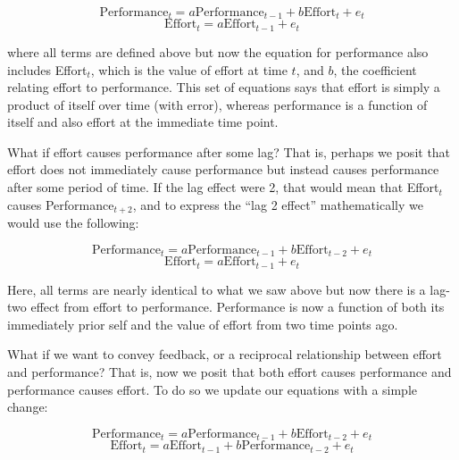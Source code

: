 \documentclass[english,,man]{apa6}
\theoremstyle{definition}
\theoremstyle{definition}
\theoremstyle{definition}
\theoremstyle{remark}
\begin{document}
\begin{equation}
\label{sysy2}
\textrm{Performance}_{t} = a \textrm{Performance}_{t - 1} + b \textrm{Effort}_{t} + e_{t}
\end{equation} \begin{equation}
\label{sysx2}
\textrm{Effort}_{t} = a \textrm{Effort}_{t - 1} + e_{t}
\end{equation}

\noindent where all terms are defined above but now the equation for
performance also includes Effort\(_t\), which is the value of effort at
time \(t\), and \(b\), the coefficient relating effort to performance.
This set of equations says that effort is simply a product of itself
over time (with error), whereas performance is a function of itself and
also effort at the immediate time point.

What if effort causes performance after some lag? That is, perhaps we
posit that effort does not immediately cause performance but instead
causes performance after some period of time. If the lag effect were 2,
that would mean that Effort\(_t\) causes Performance\(_{t+2}\), and to
express the \enquote{lag 2 effect} mathematically we would use the
following:

\begin{equation}
\label{sysy3}
\textrm{Performance}_{t} = a \textrm{Performance}_{t - 1} + b \textrm{Effort}_{t - 2} + e_{t}
\end{equation} \begin{equation}
\label{sysx3}
\textrm{Effort}_{t} = a \textrm{Effort}_{t - 1} + e_{t}
\end{equation}

\noindent Here, all terms are nearly identical to what we saw above but
now there is a lag-two effect from effort to performance. Performance is
now a function of both its immediately prior self and the value of
effort from two time points ago.

What if we want to convey feedback, or a reciprocal relationship between
effort and performance? That is, now we posit that both effort causes
performance and performance causes effort. To do so we update our
equations with a simple change:

\begin{equation}
\label{sysy3}
\textrm{Performance}_{t} = a \textrm{Performance}_{t - 1} + b \textrm{Effort}_{t - 2} + e_{t}
\end{equation} \begin{equation}
\label{sysx3}
\textrm{Effort}_{t} = a \textrm{Effort}_{t - 1} + b \textrm{Performance}_{t - 2} + e_{t}
\end{equation}
\end{document}
